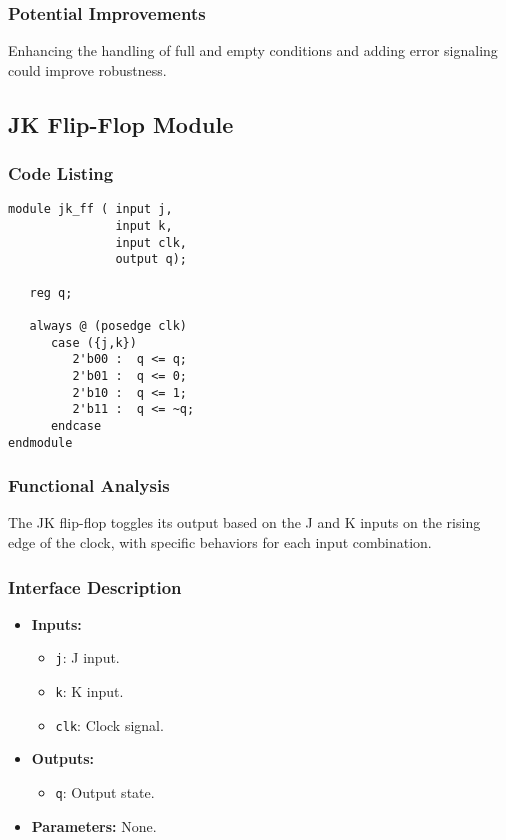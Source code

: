\documentclass[10pt]{article}
\begin{document}
\subsubsection{Potential Improvements}
Enhancing the handling of full and empty conditions and adding error signaling could improve robustness.

\subsection{JK Flip-Flop Module}

\subsubsection{Code Listing}
\begin{verbatim}
module jk_ff ( input j,
               input k,
               input clk,
               output q);

   reg q;

   always @ (posedge clk)
      case ({j,k})
         2'b00 :  q <= q;
         2'b01 :  q <= 0;
         2'b10 :  q <= 1;
         2'b11 :  q <= ~q;
      endcase
endmodule
\end{verbatim}

\subsubsection{Functional Analysis}
The JK flip-flop toggles its output based on the J and K inputs on the rising edge of the clock, with specific behaviors for each input combination.

\subsubsection{Interface Description}
\begin{itemize}
    \item \textbf{Inputs:}
    \begin{itemize}
        \item \texttt{j}: J input.
        \item \texttt{k}: K input.
        \item \texttt{clk}: Clock signal.
    \end{itemize}
    \item \textbf{Outputs:}
    \begin{itemize}
        \item \texttt{q}: Output state.
    \end{itemize}
    \item \textbf{Parameters:} None.
\end{itemize}
\end{document}
